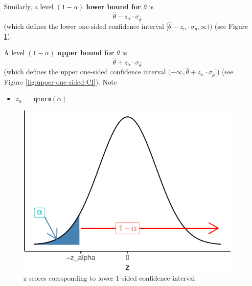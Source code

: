 \documentclass[
]{book}
\providecommand{\tightlist}{%
  \setlength{\itemsep}{0pt}\setlength{\parskip}{0pt}}
\theoremstyle{definition}
\theoremstyle{definition}
\theoremstyle{definition}
\theoremstyle{definition}
\theoremstyle{remark}
\begin{document}
Similarly, a level \((1-\alpha)\) \textbf{lower bound for \(\theta\)} is \[\hat{\theta} - z_{\alpha}\cdot \sigma_{\hat{\theta}}\] (which defines the lower one-sided confidence interval \([\hat{\theta} - z_{\alpha}\cdot \sigma_{\hat{\theta}},\infty)\)) (see Figure \ref{fig:lower-one-sided-CI}).

A level \((1-\alpha)\) \textbf{upper bound for \(\theta\)} is \[\hat{\theta} + z_{\alpha}\cdot \sigma_{\hat{\theta}}\] (which defines the upper one-sided confidence interval \((-\infty,\hat{\theta}+z_{\alpha}\cdot \sigma_{\hat{\theta}}]\)) (see Figure \ref{fig:upper-one-sided-CI}). Note

\begin{itemize}
\tightlist
\item
  \(z_\alpha =\) \texttt{qnorm}\((\alpha)\)
\end{itemize}

\begin{figure}
\centering
\includegraphics{math340-notes_files/figure-latex/lower-one-sided-CI-1.pdf}
\caption{\label{fig:lower-one-sided-CI}z scores corrsponding to lower 1-sided confidence interval}
\end{figure}
\end{document}
